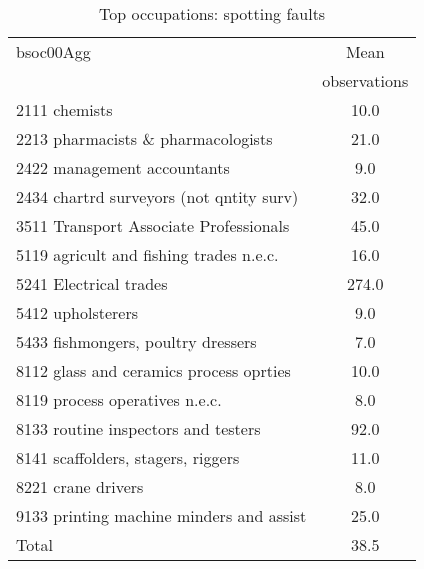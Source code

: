 \begin{table}
	\centering
	\caption{Top occupations: spotting faults}
	\begin{tabular}{lc}
	\toprule	
		
bsoc00Agg&Mean \\
&observations \\
\hline
2111 chemists&10.0 \\
2213 pharmacists \& pharmacologists&21.0 \\
2422 management accountants&9.0 \\
2434 chartrd surveyors (not qntity surv)&32.0 \\
3511 Transport Associate Professionals&45.0 \\
5119 agricult and fishing trades n.e.c.&16.0 \\
5241 Electrical trades&274.0 \\
5412 upholsterers&9.0 \\
5433 fishmongers, poultry dressers&7.0 \\
8112 glass and ceramics process oprties&10.0 \\
8119 process operatives n.e.c.&8.0 \\
8133 routine inspectors and testers&92.0 \\
8141 scaffolders, stagers, riggers&11.0 \\
8221 crane drivers&8.0 \\
9133 printing machine minders and assist&25.0 \\
Total&38.5 \\
\bottomrule
\bottomrule
\end{tabular}
\end{table}
